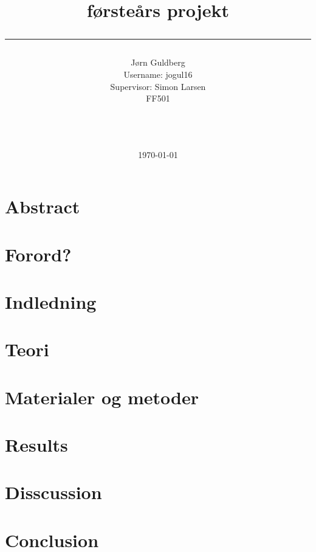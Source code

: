 \documentclass[a4paper,10pt]{article}
\title{førsteårs projekt\\\rule{10cm}{0.5mm}}
\author{Jørn Guldberg 
\\Username: jogul16
\\Supervisor: Simon Larsen\\ FF501\\\rule{5.5cm}{0.5mm}\\}
\date{\today}
\begin{document}
\maketitle

\vfill

\newpage
\section{Abstract} 
  
\newpage
\section{Forord?}
\newpage

\tableofcontents

\newpage
\section{Indledning}
\newpage

\section{Teori}

\newpage

\section{Materialer og metoder} 

\newpage

\section{Results} 

\newpage

\section{Disscussion} 


\newpage

\section{Conclusion} 


\newpage
\end{document}
